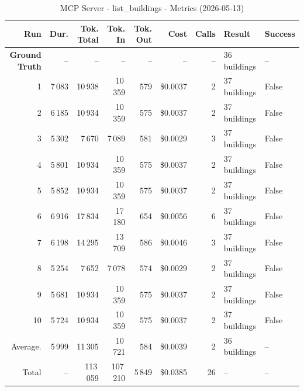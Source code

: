 \documentclass[a4paper,11pt]{article}
\begin{document}
\begin{table}[ht]
\centering
\scriptsize
\caption{MCP Server - list\_buildings - Metrics (2026-05-13)}
\label{tab:mcp\_list\_buildings\_metrics\_2026-05-13}
\begin{tabular}{r r r r r r r p{3cm} l}
\hline
Run & Dur. & Tok. Total & Tok. In & Tok. Out & Cost & Calls & Result & Success \\
\hline
\textbf{Ground Truth} & -- & -- & -- & -- & -- & -- & 36 buildings & -- \\
\hline
1 & 7\,083 & 10\,938 & 10\,359 & 579 & \$0.0037 & 2 & 37 buildings & False \\
2 & 6\,185 & 10\,934 & 10\,359 & 575 & \$0.0037 & 2 & 37 buildings & False \\
3 & 5\,302 & 7\,670 & 7\,089 & 581 & \$0.0029 & 3 & 37 buildings & False \\
4 & 5\,801 & 10\,934 & 10\,359 & 575 & \$0.0037 & 2 & 37 buildings & False \\
5 & 5\,852 & 10\,934 & 10\,359 & 575 & \$0.0037 & 2 & 37 buildings & False \\
6 & 6\,916 & 17\,834 & 17\,180 & 654 & \$0.0056 & 6 & 37 buildings & False \\
7 & 6\,198 & 14\,295 & 13\,709 & 586 & \$0.0046 & 3 & 37 buildings & False \\
8 & 5\,254 & 7\,652 & 7\,078 & 574 & \$0.0029 & 2 & 37 buildings & False \\
9 & 5\,681 & 10\,934 & 10\,359 & 575 & \$0.0037 & 2 & 37 buildings & False \\
10 & 5\,724 & 10\,934 & 10\,359 & 575 & \$0.0037 & 2 & 37 buildings & False \\
\hline
Average. & 5\,999 & 11\,305 & 10\,721 & 584 & \$0.0039 & 2 & 36 buildings & -- \\
Total & -- & 113\,059 & 107\,210 & 5\,849 & \$0.0385 & 26 & -- & -- \\
\hline
\end{tabular}
\end{table}

\clearpage
\end{document}
